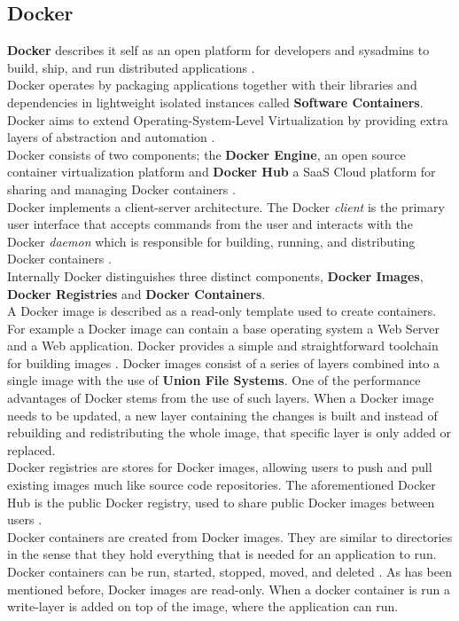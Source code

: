 \documentclass{article}
\begin{document}
\subsection{Docker}
\textbf{Docker} describes it self as an open platform for developers and sysadmins to build, ship, and run distributed applications \cite{docker-whatis}. \\
Docker operates by packaging applications together with their libraries and dependencies in lightweight isolated instances called \textbf{Software Containers}. Docker aims to extend Operating-System-Level Virtualization by providing extra layers of abstraction and automation \cite{docker-docs}.\\
Docker consists of two components; the \textbf{Docker Engine}, an open source container virtualization platform and \textbf{Docker Hub} a SaaS Cloud platform for sharing and managing Docker containers \cite{docker-components}.\\
Docker implements a client-server architecture. The Docker \textit{client} is the primary user interface that accepts commands from the user and interacts with the Docker \textit{daemon} which is responsible for building, running, and distributing Docker containers \cite{docker-architecture}.\\
Internally Docker distinguishes three distinct components, \textbf{Docker Images}, \textbf{Docker Registries} and \textbf{Docker Containers}.\\
A Docker image is described as a read-only template used to create containers. For example a Docker image can contain a base operating system a Web Server and a Web application. Docker provides a simple and straightforward toolchain for building images \cite{docker-inside}. Docker images consist of a series of layers combined into a single image with the use of \textbf{Union File Systems}. One of the performance advantages of Docker stems from the use of such layers. When a Docker image needs to be updated, a new layer containing the changes is built and instead of rebuilding and redistributing the whole image, that specific layer is only added or replaced\cite{docker-images}.\\
Docker registries are stores for Docker images, allowing users to push and pull existing images much like source code repositories\cite{docker-registries}. The aforementioned Docker Hub is the public Docker registry, used to share public Docker images between users \cite{docker-inside}.\\
Docker containers are created from Docker images. They are similar to directories in the sense that they hold everything that is needed for an application to run. Docker containers can be run, started, stopped, moved, and deleted \cite{docker-inside}. As has been mentioned before, Docker images are read-only. When a docker container is run a write-layer is added on top of the image, where the application can run\cite{docker-containers}.\\
\end{document}
